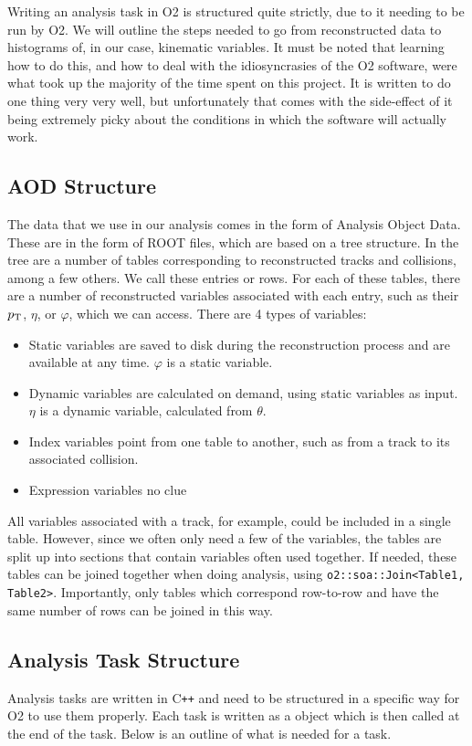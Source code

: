 Writing an analysis task in O2 is structured quite strictly, due to it needing to be run by O2. We will outline the steps needed to go from reconstructed data to histograms of, in our case, kinematic variables. It must be noted that learning how to do this, and how to deal with the idiosyncrasies of the O2 software, were what took up the majority of the time spent on this project. It is written to do one thing very very well, but unfortunately that comes with the side-effect of it being extremely picky about the conditions in which the software will actually work. 

\subsection{AOD Structure}\label{sec:AODStructure}
The data that we use in our analysis comes in the form of Analysis Object Data. These are in the form of ROOT files, which are based on a tree structure. In the tree are a number of tables corresponding to reconstructed tracks and collisions, among a few others. We call these entries or rows. For each of these tables, there are a number of reconstructed variables associated with each entry, such as their $p_\mathrm{T}$, $\eta$, or $\varphi$, which we can access. There are 4 types of variables:
\begin{itemize}
    \item Static variables are saved to disk during the reconstruction process and are available at any time. $\varphi$ is a static variable.
    \item Dynamic variables are calculated on demand, using static variables as input. $\eta$ is a dynamic variable, calculated from $\theta$. 
    \item Index variables point from one table to another, such as from a track to its associated collision.
    \item Expression variables no clue
\end{itemize}

All variables associated with a track, for example, could be included in a single table. However, since we often only need a few of the variables, the tables are split up into sections that contain variables often used together. If needed, these tables can be joined together when doing analysis, using \texttt{o2::soa::Join<Table1, Table2>}. Importantly, only tables which correspond row-to-row and have the same number of rows can be joined in this way.

\subsection{Analysis Task Structure}\label{sec:TaskStructure}
Analysis tasks are written in C\texttt{++} and need to be structured in a specific way for O2 to use them properly. Each task is written as a  object which is then called at the end of the task. Below is an outline of what is needed for a task.

